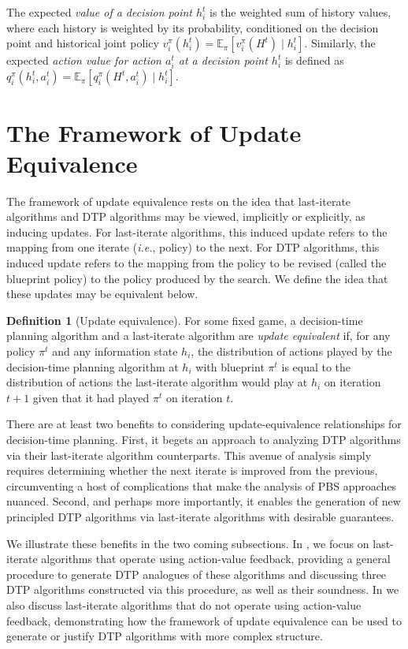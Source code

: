 \documentclass{article} %
\theoremstyle{plain}
\theoremstyle{definition}
\newtheorem{definition}[theorem]{Definition}
\theoremstyle{remark}
\begin{document}
The expected \textit{value of a decision point $h^t_i$} is the weighted sum of history values, where each history is weighted by its probability, conditioned on the decision point and historical joint policy
$v^{\pi}_i(h^t_i) = \mathbb{E}_{\pi} \left[ v_i^{\pi}(H^t) \mid h^t_i \right]$.
Similarly, the expected \textit{action value for action $a_i^t$ at a decision point $h^t_i$} is defined as
$q^{\pi}_i(h^t_i, a_i^t) = \mathbb{E}_{\pi} \left[q_i^{\pi}(H^t, a_i^t) \mid h^t_i \right]$.

\section{The Framework of Update Equivalence}

The framework of update equivalence rests on the idea that last-iterate algorithms and DTP algorithms may be viewed, implicitly or explicitly, as inducing updates.
For last-iterate algorithms, this induced update refers to the mapping from one iterate (\emph{i.e.}, policy) to the next.
For DTP algorithms, this induced update refers to the mapping from the policy to be revised (called the blueprint policy) to the policy produced by the search.
We define the idea that these updates may be equivalent below.

\begin{definition}[Update equivalence] \label{def:ue}
    For some fixed game, a decision-time planning algorithm and a last-iterate algorithm are \emph{update equivalent} if, for any policy $\pi^t$ and any information state $h_i$, the distribution of actions played by the decision-time planning algorithm at $h_i$ with blueprint $\pi^t$ is equal to the distribution of actions the last-iterate algorithm would play at $h_i$ on iteration $t+1$ given that it had played $\pi^t$ on iteration $t$.
\end{definition}

There are at least two benefits to considering update-equivalence relationships for decision-time planning.
First, it begets an approach to analyzing DTP algorithms via their last-iterate algorithm counterparts.
This avenue of analysis simply requires determining whether the next iterate is improved from the previous, circumventing a host of complications that make the analysis of PBS approaches nuanced.
Second, and perhaps more importantly, it enables the generation of new principled DTP algorithms via last-iterate algorithms with desirable guarantees.

We illustrate these benefits in the two coming subsections. In , we focus on last-iterate algorithms that operate using action-value feedback, providing a general procedure to generate DTP analogues of these algorithms and discussing three DTP algorithms constructed via this procedure, as well as their soundness.
In  we also discuss last-iterate algorithms that do not operate using action-value feedback, demonstrating how the framework of update equivalence can be used to generate or justify DTP algorithms with more complex structure.
\end{document}
